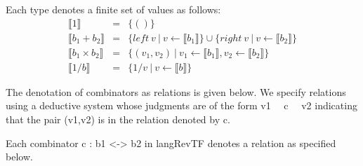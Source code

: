\documentclass{llncs}
\begin{document}
\begin{definition}
\label{chx:def:denot}
Each type denotes a finite set of values as follows:
\[\begin{array}{rcl}
\llbracket 1 \rrbracket &=& \{ () \} \\
\llbracket b_1 + b_2 \rrbracket &=& \{ \mathit{left}~v ~|~ v \leftarrow \llbracket b_1 \rrbracket \} \cup \{ \mathit{right}~v ~|~ v \leftarrow \llbracket b_2 \rrbracket \} \\
\llbracket b_1 \times b_2 \rrbracket &=& \{ (v_1,v_2) ~|~ v_1 \leftarrow \llbracket b_1 \rrbracket, v_2 \leftarrow \llbracket b_2 \rrbracket \} \\
\llbracket 1/b \rrbracket &=& \{ 1/v ~|~ v \leftarrow \llbracket b \rrbracket \} 
\end{array}\]
\end{definition}

The denotation of combinators as relations is given below. We specify
relations using a deductive system whose judgments are of the form 
{{ v1 ~~c~~ v2 }} indicating that the pair {{(v1,v2)}} is in the relation 
denoted by {{c}}.

\begin{definition}
\label{def:relational-langRevTF}
Each combinator {{c : b1 <-> b2}} in {{langRevTF}} denotes a relation
as specified below. 

%
%
%
%
%
%
%
%
%
%
%
%
\end{definition}
\end{document}
